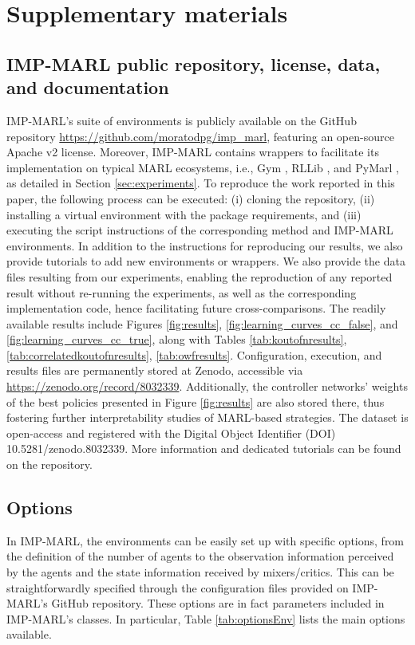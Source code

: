 \chapter{Supplementary materials} \label{ch:ch5_appendix}
\section{IMP-MARL public repository, license, data, and documentation}
\label{sec:ch5_appendix_imp_public_repo}
IMP-MARL's suite of environments is publicly available on the GitHub repository \url{https://github.com/moratodpg/imp\_marl}, featuring an open-source Apache v2 license.  Moreover, IMP-MARL contains wrappers to facilitate its implementation on typical MARL ecosystems, i.e., Gym \citep{openaigym}, RLLib \citep{liang2018rllib}, and PyMarl \citep{samvelyan2019starcraft}, as detailed in Section \ref{sec:experiments}.
To reproduce the work reported in this paper, the following process can be executed: (i) cloning the repository, (ii) installing a virtual environment with the package requirements, and (iii) executing the script instructions of the corresponding method and IMP-MARL environments.
In addition to the instructions for reproducing our results, we also provide tutorials to add new environments or wrappers.
We also provide the data files resulting from our experiments, enabling the reproduction of any reported result without re-running the experiments, as well as the corresponding implementation code, hence facilitating future cross-comparisons.
The readily available results include Figures \ref{fig:results}, \ref{fig:learning_curves_cc_false}, and \ref{fig:learning_curves_cc_true}, along with Tables \ref{tab:koutofnresults}, \ref{tab:correlatedkoutofnresults}, \ref{tab:owfresults}.
Configuration, execution, and results files are permanently stored at Zenodo, accessible via \url{https://zenodo.org/record/8032339}. 
Additionally, the controller networks' weights of the best policies presented in Figure \ref{fig:results} are also stored there, thus fostering further interpretability studies of MARL-based strategies.
The dataset is open-access and registered with the Digital Object Identifier (DOI) 10.5281/zenodo.8032339.
More information and dedicated tutorials can be found on the repository.

\section{Options}
\label{sec:ch5_options}
In IMP-MARL, the environments can be easily set up with specific options, from the definition of the number of agents to the observation information perceived by the agents and the state information received by mixers/critics. This can be straightforwardly specified through the configuration files provided on IMP-MARL's GitHub repository.
These options are in fact parameters included in IMP-MARL's classes.
In particular, Table \ref{tab:optionsEnv} lists the main options available.

